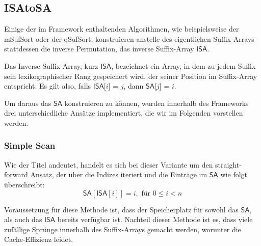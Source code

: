 \subsection{ISAtoSA}
\label{isa2sa}
Einige der im Framework enthaltenden Algorithmen, wie beispielsweise der mSufSort oder der qSufSort, konstruieren anstelle des eigentlichen Suffix-Arrays stattdessen die inverse Permutation, das inverse Suffix-Array $\mathsf{ISA}$. \\
\begin{definition}
Das Inverse Suffix-Array, kurz $\mathsf{ISA}$, bezeichnet ein Array, in dem zu jedem
Suffix sein lexikographischer Rang gespeichert wird, der seiner Position
im Suffix-Array entspricht.
Es gilt also, falls $\mathsf{ISA}$[$i$] = $j$, dann $\mathsf{SA}$[$j$] = $i$.
\end{definition}
Um daraus das $\mathsf{SA}$ konstruieren zu können, wurden innerhalb des Frameworks drei unterschiedliche Ansätze implementiert, die wir im Folgenden vorstellen werden.
\subsubsection{Simple Scan}
Wie der Titel andeutet, handelt es sich bei dieser Variante um den straight-forward Ansatz, der über die Indizes iteriert und die Einträge im $\mathsf{SA}$ wie folgt überschreibt:
\begin{equation}
\mathsf{SA}[\mathsf{ISA}[i]]=i, \text{ für } 0\leq i < n
\end{equation}

Voraussetzung für diese Methode ist, dass der Speicherplatz für sowohl das $\mathsf{SA}$, als auch das $\mathsf{ISA}$ bereits verfügbar ist. Nachteil dieser Methode ist es, dass viele zufällige Sprünge innerhalb des Suffix-Arrays gemacht werden, worunter die Cache-Effizienz leidet. 
